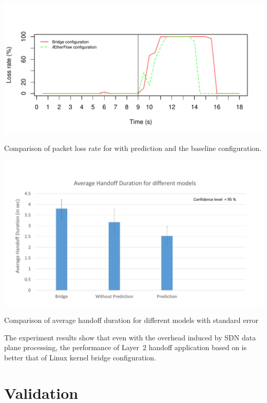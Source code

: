 \begin{table}
\centering
\includegraphics[width=.8\textwidth]{figures/loss}
\caption{Comparison of packet loss rate for \aetherflow with prediction and the baseline configuration.} %
\label{fig:loss}
\end{table}

\begin{table}
\centering
\includegraphics[width=.8\textwidth]{figures/confidence}
\caption{Comparison of average handoff duration for different models with standard error} 
\label{fig:confidence}
\end{table}

The experiment results show that even with the overhead induced by SDN data plane processing, the performance of Layer~2 handoff application based
on \aetherflow is better that of Linux kernel bridge configuration. %



\section{\crossflow Validation}


